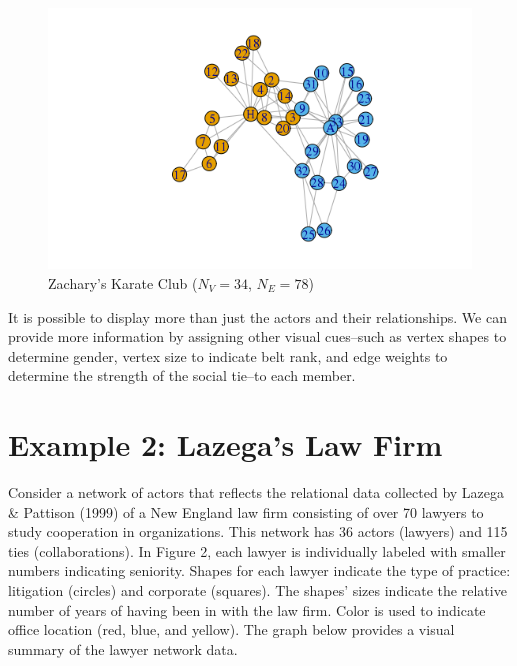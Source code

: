 \documentclass[12pt,twoside]{amherstthesis}
\begin{document}
  \begin{figure}[htbp]
  \centering
  \includegraphics{figure/01karateplot.png}
  \caption{Zachary's Karate Club (\(N_V = 34\), \(N_E = 78\))}
  \end{figure}
  
  It is possible to display more than just the actors and their
  relationships. We can provide more information by assigning other visual
  cues--such as vertex shapes to determine gender, vertex size to indicate
  belt rank, and edge weights to determine the strength of the social
  tie--to each member.
  
  \section{Example 2: Lazega's Law Firm}\label{example-2-lazegas-law-firm}
  
  Consider a network of actors that reflects the relational data collected
  by Lazega \& Pattison (1999) of a New England law firm consisting of
  over 70 lawyers to study cooperation in organizations. This network has
  36 actors (lawyers) and 115 ties (collaborations). In Figure 2, each
  lawyer is individually labeled with smaller numbers indicating
  seniority. Shapes for each lawyer indicate the type of practice:
  litigation (circles) and corporate (squares). The shapes' sizes indicate
  the relative number of years of having been in with the law firm. Color
  is used to indicate office location (red, blue, and yellow). The graph
  below provides a visual summary of the lawyer network data.
  
\end{document}
